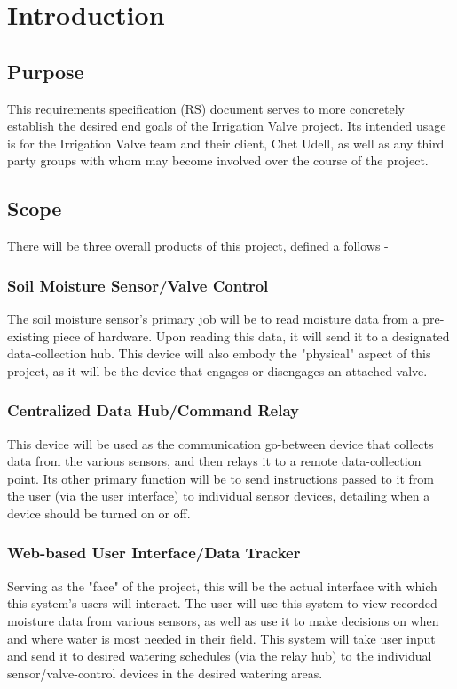 \documentclass[onecolumn, draftclsnofoot,10pt, compsoc]{IEEEtran}
\begin{document}
	\section{Introduction}
	\subsection{Purpose}
	This requirements specification (RS) document serves to more concretely establish the desired end goals of the Irrigation Valve project.
	Its intended usage is for the Irrigation Valve team and their client, Chet Udell, as well as any third party groups with whom may become involved over the course of the project. 
	\subsection{Scope}
	There will be three overall products of this project, defined a follows -\vspace{-.1in}
	\subsubsection{Soil Moisture Sensor/Valve Control}
	The soil moisture sensor's primary job will be to read moisture data from a pre-existing piece of hardware.
	Upon reading this data, it will send it to a designated data-collection hub.
	This device will also embody the "physical" aspect of this project, as it will be the device that engages or disengages an attached valve.
	\subsubsection{Centralized Data Hub/Command Relay}
	This device will be used as the communication go-between device that collects data from the various sensors, and then relays it to a remote data-collection point.
	Its other primary function will be to send instructions passed to it from the user (via the user interface) to individual sensor devices, detailing when a device should be turned on or off.
	\subsubsection{Web-based User Interface/Data Tracker}
	Serving as the "face" of the project, this will be the actual interface with which this system's users will interact.
	The user will use this system to view recorded moisture data from various sensors, as well as use it to make decisions on when and where water is most needed in their field.
	This system will take user input and send it to desired watering schedules (via the relay hub) to the individual sensor/valve-control devices in the desired watering areas.
\end{document}
